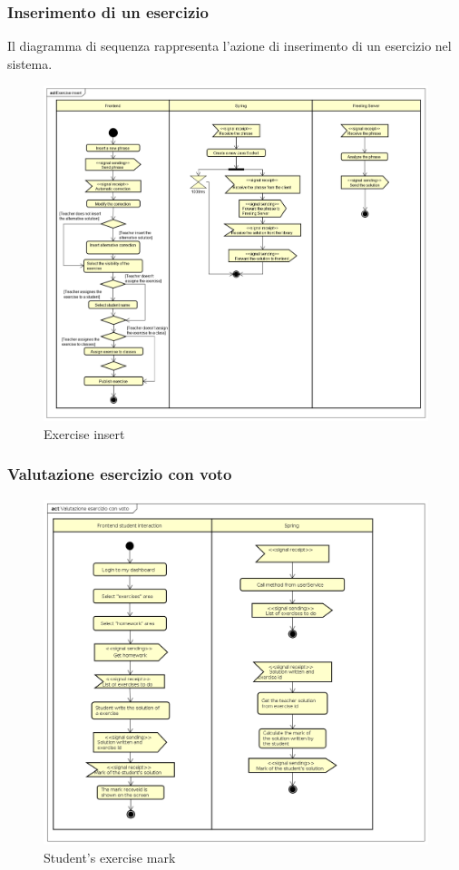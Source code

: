 \subsubsection{Inserimento di un esercizio}
Il diagramma di sequenza rappresenta l'azione di inserimento di un esercizio nel sistema.
\begin{figure}[H]
\centering
\includegraphics[width=17cm, keepaspectratio]{img/Exercise-insert.png} 
\caption{Exercise insert}
\end{figure}

\subsubsection{Valutazione esercizio con voto}
\begin{figure}[H]
\centering
\includegraphics[width=17cm, keepaspectratio]{img/Student-exercise-mark.png} 
\caption{Student's exercise mark}
\end{figure}

